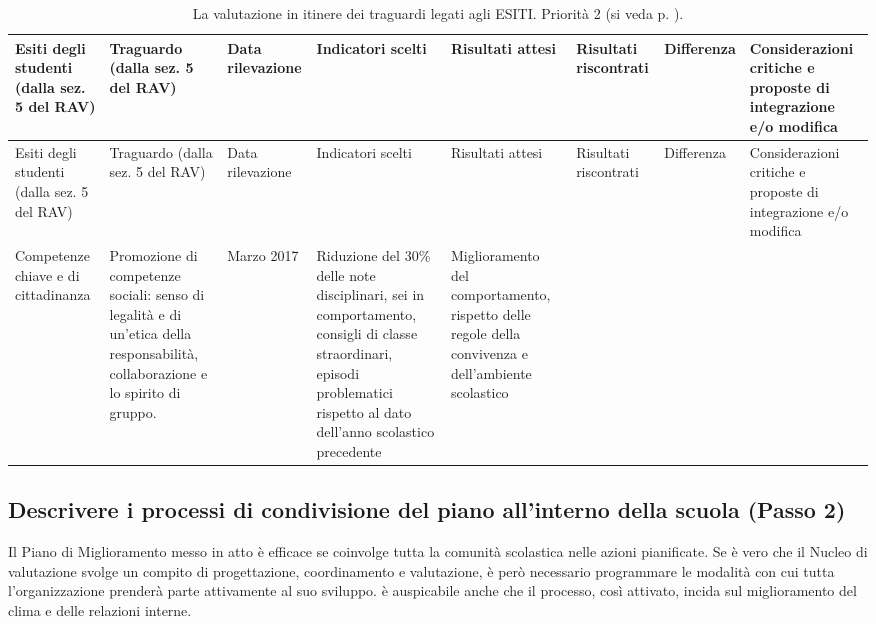\documentclass[12pt,a4paper,oneside]{memoir}
\begin{document}
\begin{footnotesize}
\begin{longtable}{|>{\raggedright}p{1.248cm}|>{\raggedright}p{1.248cm}|>{\raggedright}p{1.248cm}|>{\raggedright}p{1.248cm}|>{\raggedright}p{1.248cm}|>{\raggedright}p{1.248cm}|>{\raggedright}p{1.248cm}|>{\raggedright\arraybackslash}p{1.248cm}|}
\caption{La valutazione in itinere dei traguardi legati agli ESITI. Priorità 2 (si veda p. \pageref{priorità}).}  \label{valutazione-in-itinere2}\\
\hline
\rowcolor{violetto}
Esiti degli studenti (dalla sez. 5 del RAV)&Tra\-guar\-do (dalla sez. 5 del RAV)&Data ri\-le\-va\-zio\-ne&In\-di\-ca\-to\-ri scel\-ti&Ri\-sul\-ta\-ti at\-te\-si&Ri\-sul\-ta\-ti ris\-con\-tra\-ti&Dif\-fe\-ren\-za&Con\-si\-de\-ra\-zio\-ni cri\-ti\-che e pro\-po\-ste di in\-te\-gra\-zio\-ne e/o mo\-di\-fi\-ca\\\hline
\endfirsthead
\hline
\rowcolor{violetto}
Esiti degli studenti (dalla sez. 5 del RAV)&Tra\-guar\-do (dalla sez. 5 del RAV)&Data ri\-le\-va\-zio\-ne&In\-di\-ca\-to\-ri scel\-ti&Ri\-sul\-ta\-ti at\-te\-si&Ri\-sul\-ta\-ti ris\-con\-tra\-ti&Dif\-fe\-ren\-za&Con\-si\-de\-ra\-zio\-ni cri\-ti\-che e pro\-po\-ste di in\-te\-gra\-zio\-ne e/o mo\-di\-fi\-ca\\\hline
\endhead
\hline \multicolumn{8}{r}{\emph{Continua nella pagina successiva}}
\endfoot
\hline
\endlastfoot
Com\-pe\-ten\-ze chiave e di cit\-ta\-di\-nan\-za&Pro\-mo\-zio\-ne di com\-pe\-ten\-ze so\-cia\-li: sen\-so di le\-ga\-li\-tà e di un'etica della responsabilità, collaborazione e lo spirito di gruppo.&Mar\-zo 2017&Ri\-du\-zio\-ne del $30\%$ delle note disciplinari, sei in comportamento, consigli di classe straordinari, episodi problematici rispetto al dato dell'anno scolastico precedente&Mi\-glio\-ra\-men\-to del com\-por\-ta\-men\-to, rispetto delle regole della convivenza e dell'ambiente scolastico&&&\\\hline
\end{longtable}
\end{footnotesize}

\subsection[Passo 2. Descrivere i processi di condivisione]{Descrivere i processi di condivisione del piano all'interno della scuola (Passo 2)}

Il Piano di Miglioramento messo in atto è efficace se coinvolge tutta la comunità scolastica nelle azioni pianificate. Se è vero che il Nucleo di valutazione svolge un compito di progettazione, coordinamento e valutazione, è però necessario programmare le modalità con cui tutta l'organizzazione prenderà parte attivamente al suo sviluppo. è auspicabile anche che il processo, così attivato, incida sul miglioramento del clima e delle relazioni interne.\\
\end{document}
